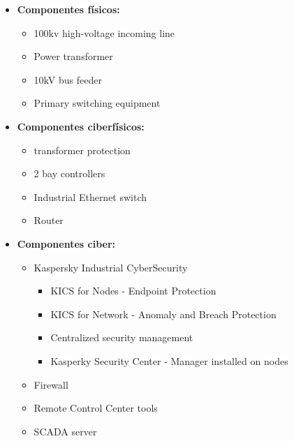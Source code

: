 \begin{itemize}
   \item \textbf{Componentes físicos:}
   \begin{itemize}
      \item 100kv high-voltage incoming line
      \item Power transformer
      \item 10kV bus feeder
      \item Primary switching equipment
   \end{itemize}
   \item \textbf{Componentes ciberfísicos:}
   \begin{itemize}
      \item transformer protection
      \item 2 bay controllers
      \item Industrial Ethernet switch
      \item Router
   \end{itemize}
   \item \textbf{Componentes ciber:}
   \begin{itemize}
      \item Kaspersky Industrial CyberSecurity
      \begin{itemize}
         \item KICS for Nodes - Endpoint Protection
         \item KICS for Network - Anomaly and Breach Protection
         \item Centralized security management
         \item Kasperky Security Center - Manager installed on nodes
      \end{itemize}
      \item Firewall
      \item Remote Control Center tools
      \item SCADA server
   \end{itemize}
\end{itemize}







